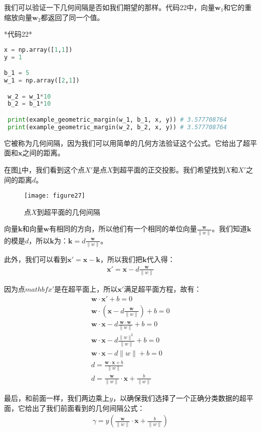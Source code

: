 我们可以验证一下几何间隔是否如我们期望的那样。代码22中，向量$\mathbf{w}_1$和它的重缩放向量$\mathbf{w}_2$都返回了同一个值。

*代码22*

\begin{lstlisting}[language=python]
x = np.array([1,1]) 
y = 1 

b_1 = 5 
w_1 = np.array([2,1])

 w_2 = w_1*10 
 b_2 = b_1*10 

 print(example_geometric_margin(w_1, b_1, x, y)) # 3.577708764 
 print(example_geometric_margin(w_2, b_2, x, y)) # 3.577708764
\end{lstlisting}
它被称为几何间隔，因为我们可以用简单的几何方法验证这个公式。它给出了超平面和$\mathbf{x}$之间的距离。

在图\ref{figure27}中，我们看到这个点$X'$是点$X$到超平面的正交投影。我们希望找到$X$和$X'$之间的距离$d$。

\begin{figure}[ht]
	\centering
	\texttt{[image: figure27]}
	\caption{点$X$到超平面的几何间隔}
	\label{figure27}
\end{figure}


向量$\mathbf{k}$和向量$\mathbf{w}$有相同的方向，所以他们有一个相同的单位向量$\frac{\mathbf{w}}{\|w\|}$。我们知道$\mathbf{k}$的模是$d$，所以$\mathbf{k}$为：$\mathbf{k}=d\frac{\mathbf{w}}{\|w\|}$。

此外，我们可以看到$\mathbf{x}'=\mathbf{x}-\mathbf{k}$，所以我们把$\mathbf{k}$代入得：
\begin{gather*}
\mathbf{x}'=\mathbf{x}-d\frac{\mathbf{w}}{\|w\|}
\end{gather*}

因为点$mathbf{x}'$是在超平面上，所以$\mathbf{x}'$满足超平面方程，故有：
\begin{gather*}
\mathbf{w} \cdot \mathbf{x}' +b = 0\\
\mathbf{w} \cdot (\mathbf{x} - d\frac{\mathbf{w}}{\|w\|})+b = 0\\
\mathbf{w}\cdot\mathbf{x} - d\frac{\mathbf{w}\cdot\mathbf{w}}{\|w\|}+b=0 \\
\mathbf{w}\cdot\mathbf{x} - d\frac{\|w\|^2}{\|w\|}+b=0 \\
\mathbf{w}\cdot\mathbf{x} - d\|w\| +b=0 \\
d = \frac{\mathbf{w}\cdot\mathbf{x}+b}{\|w\|}\\
d = \frac{\mathbf{w}}{\|w\|}\cdot \mathbf{x} + \frac{b}{\|w\|}
\end{gather*}

最后，和前面一样，我们两边乘上$y$，以确保我们选择了一个正确分类数据的超平面，它给出了我们前面看到的几何间隔公式：
\begin{gather*}
\gamma = y(\frac{\mathbf{w}}{\|w\|}\cdot \mathbf{x} + \frac{b}{\|w\|})
\end{gather*}

